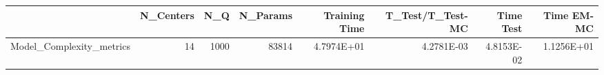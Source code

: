 \begin{tabular}{lrrrrrrr}
\toprule
{} &  N\_Centers &   N\_Q &  N\_Params &  Training Time &  T\_Test/T\_Test-MC &  Time Test &  Time EM-MC \\
\midrule
Model\_Complexity\_metrics &         14 &  1000 &     83814 &     4.7974E+01 &        4.2781E-03 & 4.8153E-02 &  1.1256E+01 \\
\bottomrule
\end{tabular}
